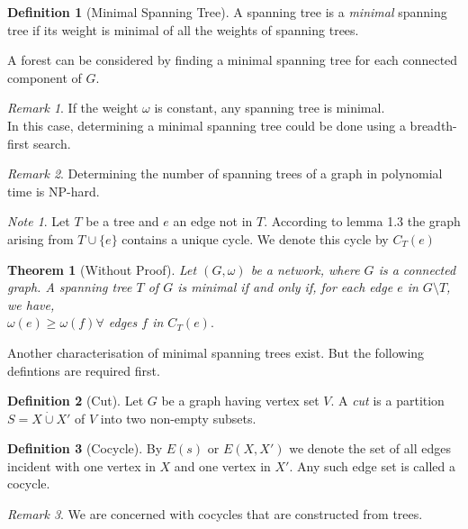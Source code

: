 \documentclass{article}
\theoremstyle{plain}
\newtheorem{thm}{Theorem}[section]
\theoremstyle{definition}
\newtheorem{defn}{Definition}[section]
\theoremstyle{remark}
\newtheorem*{rem}{Remark}
\newtheorem*{note}{Note}
\begin{document}
\begin{defn}[Minimal Spanning Tree]
A spanning tree is a \textit{minimal} spanning tree if its weight is minimal of all the weights of spanning trees.

\noindent A forest can be considered by finding a minimal spanning tree for each connected component of $G.$
\end{defn}

\begin{rem}
If the weight $\omega$ is constant, any spanning tree is minimal.\\
\noindent In this case, determining a minimal spanning tree could be done using a breadth-first search.
\end{rem}

\begin{rem}
Determining the number of spanning trees of a graph in polynomial time is NP-hard.
\end{rem}

\begin{note}
Let $T$ be a tree and $e$ an edge not in $T.$ According to lemma 1.3 the graph arising from $T \cup \{e\}$ contains a unique cycle. We denote this cycle by $C_T(e)$
\end{note}

\begin{thm}[Without Proof]
Let $(G,\omega)$ be a network, where $G$ is a connected graph. A spanning tree $T$ of $G$ is minimal if and only if, for each edge $e$ in $G \setminus T$, we have,\\
\indent\indent\indent $\omega(e) \geq \omega(f) \forall$ edges $f$ in $C_T(e).$
\end{thm}

\vspace{3mm}

Another characterisation of minimal spanning trees exist. But the following defintions are required first.

\begin{defn}[Cut]
Let $G$ be a graph having vertex set $V.$ A \textit{cut} is a partition $S = X \dot{\cup} X'$ of $V$ into two non-empty subsets.
\end{defn}

\begin{defn}[Cocycle]
By $E(s)$ or $E(X,X')$ we denote the set of all edges incident with one vertex in $X$ and one vertex in $X'.$ Any such edge set is called a cocycle.
\begin{rem}
We are concerned with cocycles that are constructed from trees.
\end{rem}
\end{defn}


 
\end{document}
